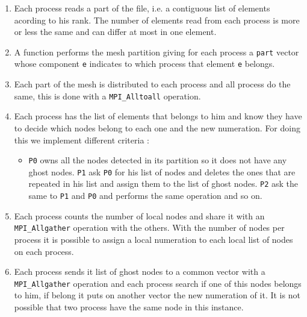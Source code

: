 \begin{enumerate}
\item Each process reads a part of the \gmsh file, i.e. a contiguous list of elements acording to his rank. The number
of elements read from each process is more or less the same and can differ at most in one element.
\item A \parmetis function performs the mesh partition giving for each process a \texttt{part} vector whose component
\texttt{e} indicates to which process that element \texttt{e} belongs. 
\item Each part of the mesh is distributed to each process and all process do the same, this is done with a
\texttt{MPI_Alltoall} operation.
\item Each process has the list of elements that belongs to him and know they have to decide which nodes belong to each
one and the new numeration. For doing this we implement different criteria : 
\begin{itemize}
\item \texttt{P0} owns all the nodes detected in its partition so it does not have any ghost nodes. \texttt{P1} ask
\texttt{P0} for his list of nodes and deletes the ones that are repeated in his list and assign them to the list of
ghost nodes. \texttt{P2} ask the same to \texttt{P1} and \texttt{P0} and performs the same operation and so on.
\end{itemize}
\item Each process counts the number of local nodes and share it with an \texttt{MPI_Allgather} operation with the
others. With the number of nodes per process it is possible to assign a local numeration to each local list of nodes on
each process.
\item Each process sends it list of ghost nodes to a common vector with a \texttt{MPI_Allgather} operation and each
process search if one of this nodes belongs to him, if belong it puts on another vector the new numeration of it. It is
not possible that two process have the same node in this instance.
\end{enumerate}

